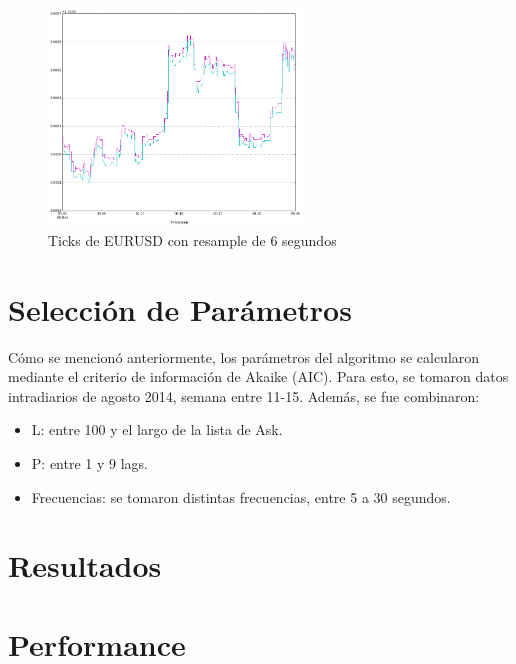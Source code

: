 \begin{figure}[h!t]
    \begin{center}
        \includegraphics[width=0.6\textwidth]{images/eurusd_6s}
        \caption{Ticks de EURUSD con resample de 6 segundos}
        \label{fig:eurusd_r6s}
    \end{center}
\end{figure}

\newpage
\section{Selección de Parámetros}
Cómo se mencionó anteriormente, los parámetros del algoritmo se calcularon
mediante el criterio de información de Akaike (AIC). Para esto, se tomaron
datos intradiarios de agosto 2014, semana entre 11-15. Además, se fue
combinaron:
\begin{itemize}
 \item L: entre 100 y el largo de la lista de Ask.
 \item P: entre 1 y 9 lags.
 \item Frecuencias: se tomaron distintas frecuencias, entre 5 a 30 segundos.
\end{itemize} 




\section{Resultados}

\section{Performance}

